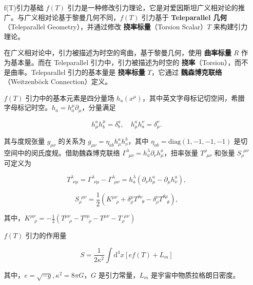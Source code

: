 \documentclass[9pt, dvipsnames]{beamer} %
\begin{document}
\begin{frame}{f(T)引力基础}
    $f(T)$ 引力是一种修改引力理论，它是对爱因斯坦广义相对论的推广。与广义相对论基于黎曼几何不同，$f(T)$ 引力基于 \textbf{Teleparallel 几何}（Teleparallel Geometry），并通过修改 \textbf{挠率标量}（Torsion Scalar）$T$ 来构建引力理论。

    在广义相对论中，引力被描述为时空的弯曲，基于黎曼几何，使用 \textbf{曲率标量} $R$ 作为基本量。而在 Teleparallel 引力中，引力被描述为时空的 \textbf{挠率}（Torsion），而不是曲率。Teleparallel 引力的基本量是 \textbf{挠率标量} $T$，它通过 \textbf{魏森博克联络}（Weitzenböck Connection）定义。

\end{frame}

\begin{frame}

    $f(T)$ 引力中的基本元素是四分量场 $h_a(x^\mu)$，其中英文字母标记切空间，希腊字母标记时空。$h_a=h_a^\mu\partial_\mu$，分量满足

    $$
    h_\mu^a h_b^\mu = \delta_b^a,\quad h_\mu^a h_a^\nu = \delta_\mu^\nu.
    $$

    其与度规张量 $g_{\mu\nu}$ 的关系为 $ g_{\mu\nu}=\eta_{ab}h_\mu^ah_\nu^b$，其中 $\eta_{ab}=\mathrm{diag}(1,-1,-1,-1)$ 是切空间中的闵氏度规。借助魏森博克联络 $\Gamma_{~~\mu\nu}^{\lambda}=h_a^\lambda \partial_\nu h_\mu^a$，扭率张量 $T^\rho_{~~\mu\nu}$ 和张量 $S_\rho^{~~\mu\nu}$ 可定义为

    $$
    T^{\lambda}_{~~\nu\mu} = \Gamma^\lambda_{~~\nu\mu} - \Gamma^\lambda_{~~\mu\nu} = h_a^\lambda\left(\partial_\nu h_\mu^a - \partial_\mu h_\nu^a \right),
    $$

    $$
    S_\rho^{~~\mu\nu} = \frac{1 }{2 } \left(K^{\mu\nu}_{~~~~\rho} + \delta_\rho^\mu T^{\theta\nu}_{~~~~\theta} - \delta_\rho^\nu T^{\theta\mu}_{~~~~\theta} \right),
    $$

    其中，$K^{\mu\nu}_{~~~~\rho}=-\frac{1}{2}(T^{\mu\nu}_{~~~~\rho}-T^{\nu\mu}_{~~~~\rho}-T^{\mu\nu}-T_\rho^{~~\mu\nu}) $

    $f(T)$ 引力的作用量

    $$
    S = \frac{1}{2\kappa^2}\int \mathrm{d}^4 x [ef(T)+L_m]
    $$

    其中，$e=\sqrt{-g},\kappa^2=8\pi G$，$G$ 是引力常量，$L_m$ 是宇宙中物质拉格朗日密度。
    
\end{frame}
\end{document}
